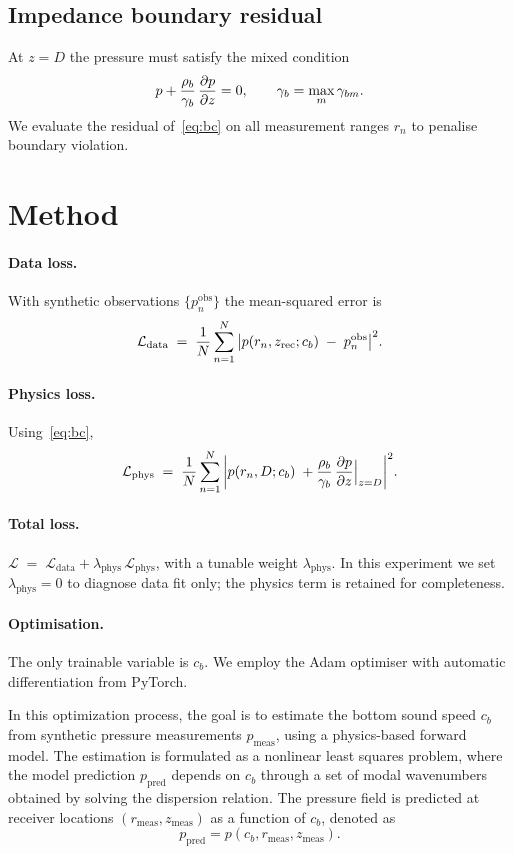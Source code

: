 \documentclass[conference]{IEEEtran}
\begin{document}
\subsection{Impedance boundary residual}

At \(z=D\) the pressure must satisfy the mixed condition
%
\begin{equation}\label{eq:bc}
  p + \frac{\rho_b}{\gamma_{b}}\,\pdv{p}{z}=0,
  \qquad \gamma_b=\max_m \gamma_{bm}.
\end{equation}
We evaluate the residual of~\eqref{eq:bc} on all measurement ranges
\(r_n\) to penalise boundary violation.

\section{Method}

\paragraph{Data loss.}
With synthetic observations \(\{p_n^{\text{obs}}\}\) the mean-squared
error is
\[
  \mathcal{L}_{\text{data}}
  \;=\;
  \frac1N\sum_{n=1}^N
  \abs{p(r_n,z_{\text{rec}};c_b)\;-\;p_n^{\text{obs}}}^2 .
\]

\paragraph{Physics loss.}
Using~\eqref{eq:bc},
\[
  \mathcal{L}_{\text{phys}}
  \;=\;
  \frac1N\sum_{n=1}^N
  \abs{
        p(r_n,D;c_b)\;
      + \frac{\rho_b}{\gamma_b}\,
        \pdv{p}{z}\Big|_{z=D}
      }^2 .
\]

\paragraph{Total loss.}
\(
  \mathcal{L} \;=\;
  \mathcal{L}_{\text{data}}
  + \lambda_{\text{phys}}\,\mathcal{L}_{\text{phys}}
\),
with a tunable weight \(\lambda_{\text{phys}}\).
In this experiment we set \(\lambda_{\text{phys}}=0\) to diagnose data
fit only; the physics term is retained for completeness.

\paragraph{Optimisation.}
The only trainable variable is \(c_b\).  We employ the Adam optimiser
with automatic differentiation from PyTorch.

In this optimization process, the goal is to estimate the bottom sound speed \( c_b \) from synthetic pressure measurements \( p_{\text{meas}} \), using a physics-based forward model. The estimation is formulated as a nonlinear least squares problem, where the model prediction \( p_{\text{pred}} \) depends on \( c_b \) through a set of modal wavenumbers obtained by solving the dispersion relation. The pressure field is predicted at receiver locations \( (r_{\text{meas}}, z_{\text{meas}}) \) as a function of \( c_b \), denoted as
\[
p_{\text{pred}} = p(c_b, r_{\text{meas}}, z_{\text{meas}}).
\]
\end{document}
